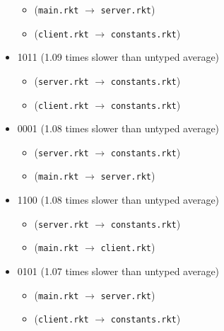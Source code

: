 \documentclass{article}
\newcommand{\mono}[1]{\texttt{#1}}
\begin{document}
\begin{itemize}
  \begin{itemize}
  \item (\mono{main.rkt} $\rightarrow$ \mono{server.rkt})
  \item (\mono{client.rkt} $\rightarrow$ \mono{constants.rkt})
  \end{itemize}
\item 1011 (1.09 times slower than untyped average)
  \begin{itemize}
  \item (\mono{server.rkt} $\rightarrow$ \mono{constants.rkt})
  \item (\mono{client.rkt} $\rightarrow$ \mono{constants.rkt})
  \end{itemize}
\item 0001 (1.08 times slower than untyped average)
  \begin{itemize}
  \item (\mono{server.rkt} $\rightarrow$ \mono{constants.rkt})
  \item (\mono{main.rkt} $\rightarrow$ \mono{server.rkt})
  \end{itemize}
\item 1100 (1.08 times slower than untyped average)
  \begin{itemize}
  \item (\mono{server.rkt} $\rightarrow$ \mono{constants.rkt})
  \item (\mono{main.rkt} $\rightarrow$ \mono{client.rkt})
  \end{itemize}
\item 0101 (1.07 times slower than untyped average)
  \begin{itemize}
  \item (\mono{main.rkt} $\rightarrow$ \mono{server.rkt})
  \item (\mono{client.rkt} $\rightarrow$ \mono{constants.rkt})
  \end{itemize}


\end{itemize}
\end{document}
